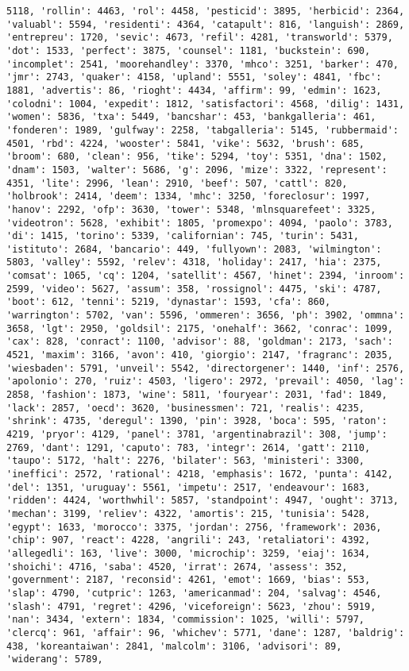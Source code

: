 \documentclass[11pt]{article}
\begin{document}
\begin{Verbatim}[commandchars=\\\{\}]
5118, 'rollin': 4463, 'rol': 4458, 'pesticid': 3895, 'herbicid': 2364, 'valuabl': 5594, 'residenti': 4364, 'catapult': 816, 'languish': 2869, 'entrepreu': 1720, 'sevic': 4673, 'refil': 4281, 'transworld': 5379, 'dot': 1533, 'perfect': 3875, 'counsel': 1181, 'buckstein': 690, 'incomplet': 2541, 'moorehandley': 3370, 'mhco': 3251, 'barker': 470, 'jmr': 2743, 'quaker': 4158, 'upland': 5551, 'soley': 4841, 'fbc': 1881, 'advertis': 86, 'rioght': 4434, 'affirm': 99, 'edmin': 1623, 'colodni': 1004, 'expedit': 1812, 'satisfactori': 4568, 'dilig': 1431, 'women': 5836, 'txa': 5449, 'bancshar': 453, 'bankgalleria': 461, 'fonderen': 1989, 'gulfway': 2258, 'tabgalleria': 5145, 'rubbermaid': 4501, 'rbd': 4224, 'wooster': 5841, 'vike': 5632, 'brush': 685, 'broom': 680, 'clean': 956, 'tike': 5294, 'toy': 5351, 'dna': 1502, 'dnam': 1503, 'walter': 5686, 'g': 2096, 'mize': 3322, 'represent': 4351, 'lite': 2996, 'lean': 2910, 'beef': 507, 'cattl': 820, 'holbrook': 2414, 'deem': 1334, 'mhc': 3250, 'foreclosur': 1997, 'hanov': 2292, 'ofp': 3630, 'tower': 5348, 'mlnsquarefeet': 3325, 'videotron': 5628, 'exhibit': 1805, 'promexpo': 4094, 'paolo': 3783, 'di': 1415, 'torino': 5339, 'californian': 745, 'turin': 5431, 'istituto': 2684, 'bancario': 449, 'fullyown': 2083, 'wilmington': 5803, 'valley': 5592, 'relev': 4318, 'holiday': 2417, 'hia': 2375, 'comsat': 1065, 'cq': 1204, 'satellit': 4567, 'hinet': 2394, 'inroom': 2599, 'video': 5627, 'assum': 358, 'rossignol': 4475, 'ski': 4787, 'boot': 612, 'tenni': 5219, 'dynastar': 1593, 'cfa': 860, 'warrington': 5702, 'van': 5596, 'ommeren': 3656, 'ph': 3902, 'ommna': 3658, 'lgt': 2950, 'goldsil': 2175, 'onehalf': 3662, 'conrac': 1099, 'cax': 828, 'conract': 1100, 'advisor': 88, 'goldman': 2173, 'sach': 4521, 'maxim': 3166, 'avon': 410, 'giorgio': 2147, 'fragranc': 2035, 'wiesbaden': 5791, 'unveil': 5542, 'directorgener': 1440, 'inf': 2576, 'apolonio': 270, 'ruiz': 4503, 'ligero': 2972, 'prevail': 4050, 'lag': 2858, 'fashion': 1873, 'wine': 5811, 'fouryear': 2031, 'fad': 1849, 'lack': 2857, 'oecd': 3620, 'businessmen': 721, 'realis': 4235, 'shrink': 4735, 'deregul': 1390, 'pin': 3928, 'boca': 595, 'raton': 4219, 'pryor': 4129, 'panel': 3781, 'argentinabrazil': 308, 'jump': 2769, 'dant': 1291, 'caputo': 783, 'integr': 2614, 'gatt': 2110, 'taupo': 5172, 'halt': 2276, 'bilater': 563, 'ministeri': 3300, 'ineffici': 2572, 'rational': 4218, 'emphasis': 1672, 'punta': 4142, 'del': 1351, 'uruguay': 5561, 'impetu': 2517, 'endeavour': 1683, 'ridden': 4424, 'worthwhil': 5857, 'standpoint': 4947, 'ought': 3713, 'mechan': 3199, 'reliev': 4322, 'amortis': 215, 'tunisia': 5428, 'egypt': 1633, 'morocco': 3375, 'jordan': 2756, 'framework': 2036, 'chip': 907, 'react': 4228, 'angrili': 243, 'retaliatori': 4392, 'allegedli': 163, 'live': 3000, 'microchip': 3259, 'eiaj': 1634, 'shoichi': 4716, 'saba': 4520, 'irrat': 2674, 'assess': 352, 'government': 2187, 'reconsid': 4261, 'emot': 1669, 'bias': 553, 'slap': 4790, 'cutpric': 1263, 'americanmad': 204, 'salvag': 4546, 'slash': 4791, 'regret': 4296, 'viceforeign': 5623, 'zhou': 5919, 'nan': 3434, 'extern': 1834, 'commission': 1025, 'willi': 5797, 'clercq': 961, 'affair': 96, 'whichev': 5771, 'dane': 1287, 'baldrig': 438, 'koreantaiwan': 2841, 'malcolm': 3106, 'advisori': 89, 'widerang': 5789, 
\end{Verbatim}
\end{document}
